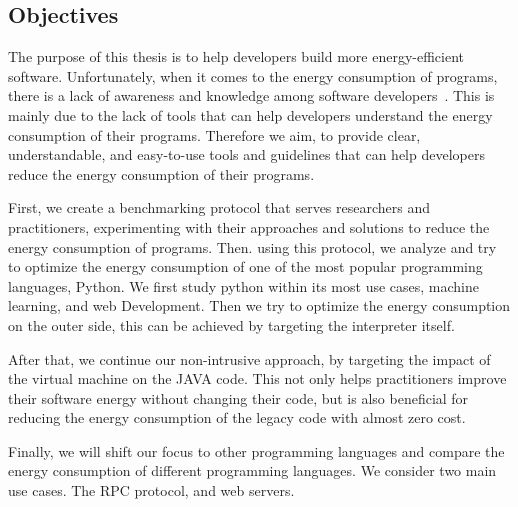 \subsection*{Objectives}

The purpose of this thesis is to help developers build more energy-efficient software. Unfortunately, when it comes to the energy consumption of programs, there is a lack of awareness and knowledge among software developers~\cite{ournani2020reducing,pang2015programmers,pinto2014mining}. This is mainly due to the lack of tools that can help developers understand the energy consumption of their programs. Therefore we aim, to provide clear, understandable, and easy-to-use tools and guidelines that can help developers reduce the energy consumption of their programs. 

First, we create a benchmarking protocol that serves researchers and practitioners, experimenting with their approaches and solutions to reduce the energy consumption of programs. 
Then. using this protocol, we analyze and try to optimize the energy consumption of one of the most popular programming languages, Python. We first study python within its most use cases, machine learning, and web Development. Then we try to optimize the energy consumption on the outer side, this can be achieved by targeting the interpreter itself. 

After that, we continue our non-intrusive approach, by targeting the impact of the virtual machine on the JAVA code. This not only helps practitioners improve their software energy without changing their code, but is also beneficial for reducing the energy consumption of the legacy code with almost zero cost. 

Finally, we will shift our focus to other programming languages and compare the energy consumption of different programming languages. 
We consider two main use cases. The RPC protocol, and web servers.











